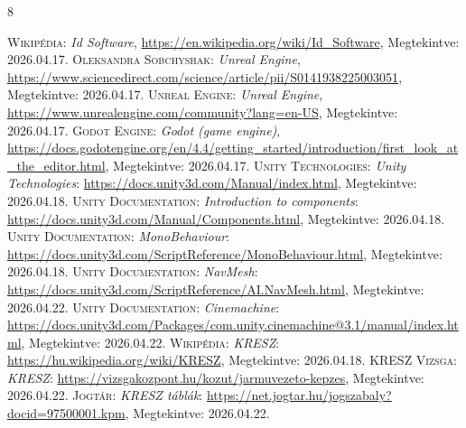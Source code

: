 \documentclass[
]{thesis-ekf}
\theoremstyle{definition}
\theoremstyle{remark}
\begin{document}
\begin{thebibliography}{8}
\textsc{Wikipédia}: \emph{Id Software}, \url{https://en.wikipedia.org/wiki/Id_Software}, Megtekintve: 2026.04.17.
\textsc{Oleksandra Sobchyshak}: \emph{Unreal Engine}, \url{https://www.sciencedirect.com/science/article/pii/S0141938225003051}, Megtekintve: 2026.04.17.
\textsc{Unreal Engine}: \emph{Unreal Engine}, \url{https://www.unrealengine.com/community?lang=en-US}, Megtekintve: 2026.04.17.
\textsc{Godot Engine}: \emph{Godot (game engine)}, \url{https://docs.godotengine.org/en/4.4/getting_started/introduction/first_look_at_the_editor.html}, Megtekintve: 2026.04.17.
\textsc{Unity Technologies}: \emph{Unity Technologies}: \url{https://docs.unity3d.com/Manual/index.html}, Megtekintve: 2026.04.18.
\textsc{Unity Documentation}: \emph{Introduction to components}: \url{https://docs.unity3d.com/Manual/Components.html}, Megtekintve: 2026.04.18.
\textsc{Unity Documentation}: \emph{MonoBehaviour}: \url{https://docs.unity3d.com/ScriptReference/MonoBehaviour.html}, Megtekintve: 2026.04.18.
\textsc{Unity Documentation}: \emph{NavMesh}: \url{https://docs.unity3d.com/ScriptReference/AI.NavMesh.html}, Megtekintve: 2026.04.22.
\textsc{Unity Documentation}: \emph{Cinemachine}: \url{https://docs.unity3d.com/Packages/com.unity.cinemachine@3.1/manual/index.html}, Megtekintve: 2026.04.22.
\textsc{Wikipédia}: \emph{KRESZ}: \url{https://hu.wikipedia.org/wiki/KRESZ}, Megtekintve: 2026.04.18.
\textsc{KRESZ Vizsga}: \emph{KRESZ}: \url{https://vizsgakozpont.hu/kozut/jarmuvezeto-kepzes}, Megtekintve: 2026.04.22.
\textsc{Jogtár}: \emph{KRESZ táblák}: \url{https://net.jogtar.hu/jogszabaly?docid=97500001.kpm}, Megtekintve: 2026.04.22.


\end{thebibliography}
\end{document}
